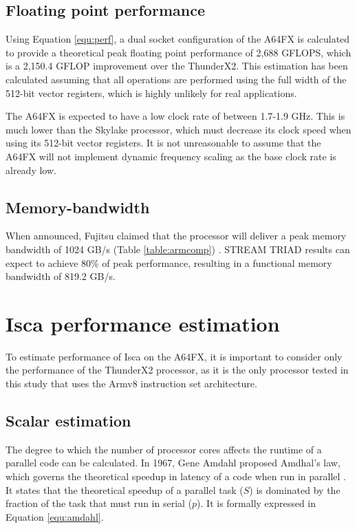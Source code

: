 \documentclass[a4paper,11pt]{report}
\begin{document}
\subsection{Floating point performance}
Using Equation \ref{equ:perf}, a dual socket configuration of the A64FX is calculated to provide a theoretical peak floating point performance of 2,688 GFLOPS, which is a 2,150.4 GFLOP improvement over the ThunderX2. This estimation has been calculated assuming that all operations are performed using the full width of the 512-bit vector registers, which is highly unlikely for real applications. 
\par
The A64FX is expected to have a low clock rate of between 1.7-1.9 GHz. This is much lower than the Skylake processor, which must decrease its clock speed when using its 512-bit vector registers. It is not unreasonable to assume that the A64FX will not implement dynamic frequency scaling as the base clock rate is already low. 

\subsection{Memory-bandwidth}
When announced, Fujitsu claimed that the processor will deliver a peak memory bandwidth of 1024 GB/s (Table \ref{table:armcomp}) \cite{yoshida2018fujitsu}. STREAM TRIAD results can expect to achieve 80\% of peak performance, resulting in a functional memory bandwidth of 819.2 GB/s. 

\section{Isca performance estimation}
To estimate performance of Isca on the A64FX, it is important to consider only the performance of the ThunderX2 processor, as it is the only processor tested in this study that uses the Armv8 instruction set architecture.


\subsection{Scalar estimation}
The degree to which the number of processor cores affects the runtime of a parallel code can be calculated. In 1967, Gene Amdahl proposed Amdhal's law, which governs the theoretical speedup in latency of a code when run in parallel \cite{amdahl1967validity}. It states that the theoretical speedup of a parallel task ($S$) is dominated by the fraction of the task that must run in serial ($p$). It is formally expressed in Equation \ref{equ:amdahl}.
\end{document}
